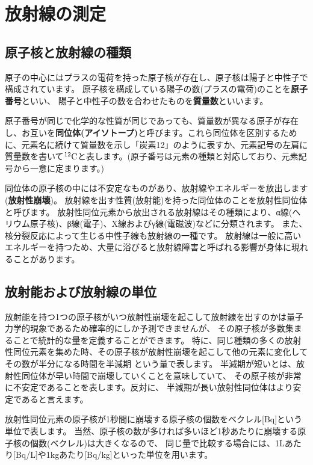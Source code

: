 %
%


\section{放射線の測定}


\subsection{原子核と放射線の種類}

原子の中心にはプラスの電荷を持った原子核が存在し、原子核は陽子と中性子で構成されています。
原子核を構成している陽子の数(プラスの電荷)のことを{\bf 原子番号}といい、
陽子と中性子の数を合わせたものを{\bf 質量数}といいます。

原子番号が同じで化学的な性質が同じであっても、質量数が異なる原子が存在し、お互いを{\bf 同位体(アイソトープ)}と呼びます。これら同位体を区別するために、元素名に続けて質量数を示し「炭素12」のように表すか、元素記号の左肩に質量数を書いて${}^{12}{\rm C}$と表します。(原子番号は元素の種類と対応しており、元素記号から一意に定まります。)

同位体の原子核の中には不安定なものがあり、放射線やエネルギーを放出します({\bf 放射性崩壊})。
放射線を出す性質(放射能)を持った同位体のことを放射性同位体と呼びます。
放射性同位元素から放出される放射線はその種類により、α線(ヘリウム原子核)、β線(電子)、X線およびγ線(電磁波)などに分類されます。
また、核分裂反応によって生じる中性子線も放射線の一種です。
放射線は一般に高いエネルギーを持つため、大量に浴びると放射線障害と呼ばれる影響が身体に現れることがあります。

\subsection{放射能および放射線の単位}

放射能を持つ1つの原子核がいつ放射性崩壊を起こして放射線を出すのかは量子力学的現象であるため確率的にしか予測できませんが、
その原子核が多数集まることで統計的な量を定義することができます。
特に、同じ種類の多くの放射性同位元素を集めた時、その原子核が放射性崩壊を起こして他の元素に変化してその数が半分になる時間を半減期
という量で表します。
半減期が短いとは、放射性同位体が早い時間で崩壊していくことを意味していて、
その原子核が非常に不安定であることを表します。反対に、
半減期が長い放射性同位体はより安定であると言えます。

放射性同位元素の原子核が1秒間に崩壊する原子核の個数をベクレル[Bq]という単位で表します。
当然、原子核の数が多ければ多いほど1秒あたりに崩壊する原子核の個数(ベクレル)は大きくなるので、
同じ量で比較する場合には、1Lあたり[Bq/L]や1kgあたり[Bq/kg]といった単位を用います。

